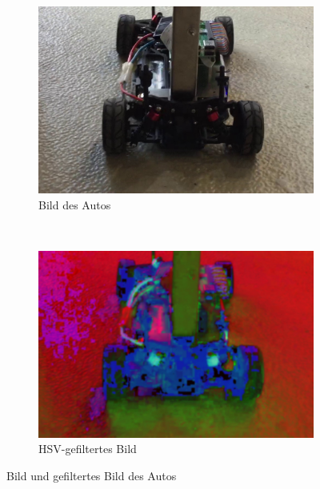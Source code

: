 \documentclass[10pt]{article}
\begin{document}
    \begin{figure}[htbp]
        \centering
        \begin{subfigure}[b]{0.4\textwidth}
            \includegraphics[width=\textwidth]{car}
            \caption{Bild des Autos}
            \label{fig:car}
        \end{subfigure}
        ~ %
        \begin{subfigure}[b]{0.4\textwidth}
            \includegraphics[width=\textwidth]{car_hsv}
            \caption{HSV-gefiltertes Bild}
            \label{fig:car_hcsv}
        \end{subfigure}
        \caption{Bild und gefiltertes Bild des Autos}\label{fig:cars}
    \end{figure}
\end{document}
